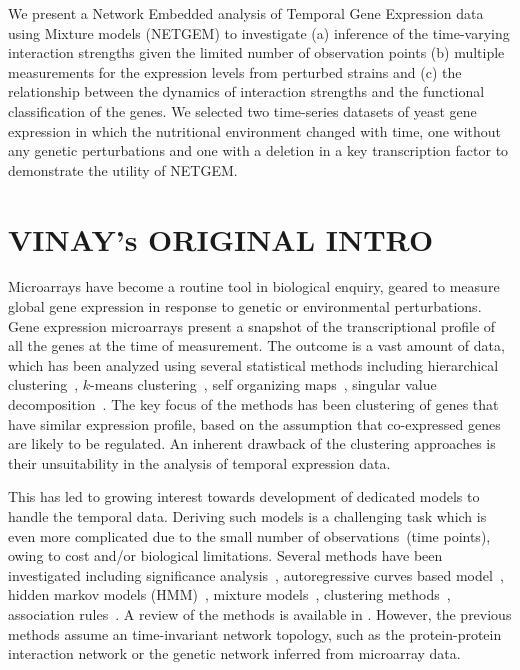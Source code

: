 \documentclass{bioinfo}
\begin{document}
We present a Network Embedded analysis of Temporal Gene Expression data using Mixture models (NETGEM) to investigate (a) inference of the time-varying interaction strengths given the limited number of
observation points (b) multiple measurements for the expression levels from perturbed strains and (c) the relationship between the dynamics of interaction strengths and the functional classification of the genes. We selected two time-series datasets of yeast gene expression in which the nutritional environment changed with time, one without any genetic perturbations and one with a deletion in a key transcription factor to demonstrate the utility of NETGEM.

\section{VINAY's ORIGINAL INTRO }


Microarrays have become a routine tool in biological enquiry, geared to measure 
global gene expression in response to genetic or 
environmental perturbations. Gene expression microarrays present a
snapshot of the transcriptional profile of all the genes at the time
of measurement. The outcome is a
vast amount of data, which has been analyzed using several statistical
methods including hierarchical clustering~\citep{Eisen98}, $k$-means
clustering~\citep{Tavazoie99}, self organizing
maps~\citep{Tomoya99som}, singular value
decomposition~\citep{DBLP:journals/bioinformatics/RifkinK02}.  
The key focus of the methods has 
been clustering of genes that have similar expression profile, based
on the assumption that co-expressed genes are likely to be regulated. 
An inherent drawback of the clustering approaches is their
unsuitability in the analysis of temporal expression data.  

This has led to growing interest towards development of dedicated
models to handle the temporal data. Deriving such models is a
challenging task which is even more complicated due to the small number of observations~(time points), owing to cost
and/or biological limitations.  Several methods have been
investigated including significance
analysis~\citep{Tusher01sam,Leek06EDGE}, autoregressive curves based
model~\citep{Ramoni02cluster}, 
hidden markov models (HMM)~\citep{DBLP:conf/ismb/SchliepSS03,citeulike:1069055}, mixture 
models~\citep{DBLP:conf/ismb/SchliepSS04,DBLP:journals/bioinformatics/CostaSS05},
clustering methods~\citep{Ernst06STEM}, association
rules~\citep{Nam2009}. A review of the methods is available in
\cite{Androulakis2007}. However, the previous methods 
assume an time-invariant network topology, such as the protein-protein
interaction network or the genetic network inferred from microarray
data. 
\end{document}
